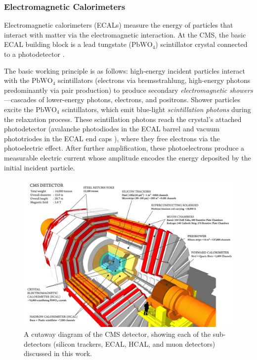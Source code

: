 \documentclass[11pt, a4paper]{article}
\newcommand{\chem}[1]{\ensuremath{\mathrm{#1}}}  %
\begin{document}
\subsubsection{Electromagnetic Calorimeters}
Electromagnetic calorimeters (ECALs) measure the energy of particles that interact with matter via the electromagnetic interaction.
At the CMS, the basic ECAL building block is a lead tungstate (\chem{PbWO_4}) scintillator crystal connected to a photodetector \cite{ecal-tdr}.

The basic working principle is as follows: high-energy incident particles interact with the \chem{PbWO_4} scintillators (electrons via bremsstrahlung, high-energy photons predominantly via pair production) to produce secondary \textit{electromagnetic showers}---cascades of lower-energy photons, electrons, and positrons.
Shower particles excite the \chem{PbWO_4} scintillators, which emit blue-light \textit{scintillation photons} during the relaxation process.
These scintillation photons reach the crystal's attached photodetector (avalanche photodiodes in the ECAL barrel and vacuum phototriodes in the ECAL end caps \cite{ecal-tdr}), where they free electrons via the photoelectric effect.
After further amplification, these photoelectrons produce a measurable electric current whose amplitude encodes the energy deposited by the initial incident particle.

\begin{figure}[htb!]
    \centering
    \includegraphics[width=0.9\linewidth]{raster/png/cms.png}
    \caption{A cutaway diagram of the CMS detector, showing each of the sub-detectors (silicon trackers, ECAL, HCAL, and muon detectors) discussed in this work.
    \cite{image-cms}}
    \label{fig:cms}
\end{figure}
\end{document}
